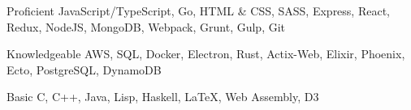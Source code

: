 

\begin{cvskills}

  \cvskill
    {Proficient} %
    {JavaScript/TypeScript, Go, HTML \& CSS, SASS, Express, React, Redux, NodeJS, MongoDB, Webpack, Grunt, Gulp, Git} %

  \cvskill
    {Knowledgeable} %
    {AWS, SQL, Docker, Electron, Rust, Actix-Web, Elixir, Phoenix, Ecto, PostgreSQL, DynamoDB} %

  \cvskill
    {Basic} %
    {C, C++, Java, Lisp, Haskell, \LaTeX, Web Assembly, D3} %

\end{cvskills}
